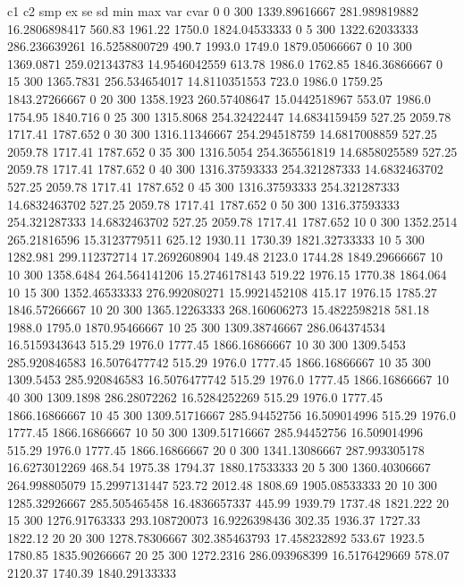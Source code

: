 c1 c2 smp ex se sd  min max var cvar
0  0  300  1339.89616667  281.989819882  16.2806898417  560.83  1961.22  1750.0  1824.04533333 
0  5  300  1322.62033333  286.236639261  16.5258800729  490.7  1993.0  1749.0  1879.05066667 
0  10  300  1369.0871  259.021343783  14.9546042559  613.78  1986.0  1762.85  1846.36866667 
0  15  300  1365.7831  256.534654017  14.8110351553  723.0  1986.0  1759.25  1843.27266667 
0  20  300  1358.1923  260.57408647  15.0442518967  553.07  1986.0  1754.95  1840.716 
0  25  300  1315.8068  254.32422447  14.6834159459  527.25  2059.78  1717.41  1787.652 
0  30  300  1316.11346667  254.294518759  14.6817008859  527.25  2059.78  1717.41  1787.652 
0  35  300  1316.5054  254.365561819  14.6858025589  527.25  2059.78  1717.41  1787.652 
0  40  300  1316.37593333  254.321287333  14.6832463702  527.25  2059.78  1717.41  1787.652 
0  45  300  1316.37593333  254.321287333  14.6832463702  527.25  2059.78  1717.41  1787.652 
0  50  300  1316.37593333  254.321287333  14.6832463702  527.25  2059.78  1717.41  1787.652 
10  0  300  1352.2514  265.21816596  15.3123779511  625.12  1930.11  1730.39  1821.32733333 
10  5  300  1282.981  299.112372714  17.2692608904  149.48  2123.0  1744.28  1849.29666667 
10  10  300  1358.6484  264.564141206  15.2746178143  519.22  1976.15  1770.38  1864.064 
10  15  300  1352.46533333  276.992080271  15.9921452108  415.17  1976.15  1785.27  1846.57266667 
10  20  300  1365.12263333  268.160606273  15.4822598218  581.18  1988.0  1795.0  1870.95466667 
10  25  300  1309.38746667  286.064374534  16.5159343643  515.29  1976.0  1777.45  1866.16866667 
10  30  300  1309.5453  285.920846583  16.5076477742  515.29  1976.0  1777.45  1866.16866667 
10  35  300  1309.5453  285.920846583  16.5076477742  515.29  1976.0  1777.45  1866.16866667 
10  40  300  1309.1898  286.28072262  16.5284252269  515.29  1976.0  1777.45  1866.16866667 
10  45  300  1309.51716667  285.94452756  16.509014996  515.29  1976.0  1777.45  1866.16866667 
10  50  300  1309.51716667  285.94452756  16.509014996  515.29  1976.0  1777.45  1866.16866667 
20  0  300  1341.13086667  287.993305178  16.6273012269  468.54  1975.38  1794.37  1880.17533333 
20  5  300  1360.40306667  264.998805079  15.2997131447  523.72  2012.48  1808.69  1905.08533333 
20  10  300  1285.32926667  285.505465458  16.4836657337  445.99  1939.79  1737.48  1821.222 
20  15  300  1276.91763333  293.108720073  16.9226398436  302.35  1936.37  1727.33  1822.12 
20  20  300  1278.78306667  302.385463793  17.458232892  533.67  1923.5  1780.85  1835.90266667 
20  25  300  1272.2316  286.093968399  16.5176429669  578.07  2120.37  1740.39  1840.29133333 
